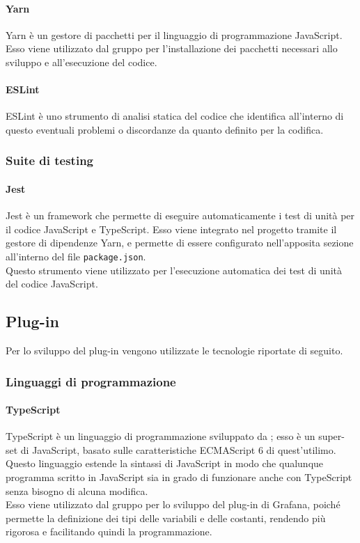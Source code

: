 \documentclass[../manuale-sviluppatore.tex]{subfiles}
\begin{document}
\paragraph{Yarn}
Yarn è un gestore di pacchetti per il linguaggio di programmazione JavaScript. Esso viene utilizzato dal gruppo per l'installazione dei pacchetti necessari allo sviluppo e all'esecuzione del codice.

\paragraph{ESLint}
ESLint è uno strumento di analisi statica del codice che identifica all'interno di questo eventuali problemi o discordanze da quanto definito per la codifica.

\subsubsection{Suite di testing}
\paragraph{Jest}
Jest è un framework che permette di eseguire automaticamente i test di unità per il codice JavaScript e TypeScript. Esso viene integrato nel progetto tramite il gestore di dipendenze Yarn, e permette di essere configurato nell'apposita sezione all'interno del file \texttt{package.json}. \\
Questo strumento viene utilizzato per l'esecuzione automatica dei test di unità del codice JavaScript.

\subsection{Plug-in}%
\label{subsc:plug_in}
Per lo sviluppo del plug-in vengono utilizzate le tecnologie riportate di seguito.
\subsubsection{Linguaggi di programmazione}
\paragraph{TypeScript}
TypeScript è un linguaggio di programmazione sviluppato da ; esso è un super-set di JavaScript, basato sulle caratteristiche ECMAScript 6 di quest'utilimo. Questo linguaggio estende la sintassi di JavaScript in modo che qualunque programma scritto in JavaScript sia in grado di funzionare anche con TypeScript senza bisogno di alcuna modifica. \\
Esso viene utilizzato dal gruppo per lo sviluppo del plug-in di Grafana, poiché permette la definizione dei tipi delle variabili e delle costanti, rendendo più rigorosa e facilitando quindi la programmazione.
\end{document}
